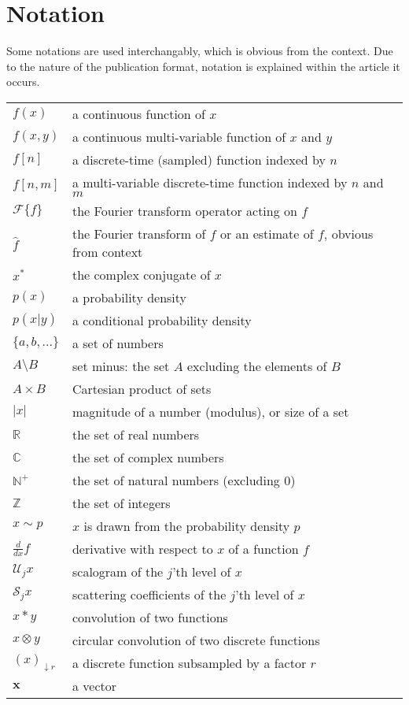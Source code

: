 \section*{Notation}
Some notations are used interchangably, which is obvious from the context. Due to the nature of the publication format, notation is explained within the article it occurs.

\begin{tabular}{p{} p{}}
    $f(x)$ & a continuous function of $x$ \\
    $f(x, y)$ & a continuous multi-variable function of $x$ and $y$ \\
    $f[n]$ & a discrete-time (sampled) function indexed by $n$ \\
    $f[n, m]$ & a multi-variable discrete-time function indexed by $n$ and $m$ \\
    $\mathcal{F} \{f\}$ & the Fourier transform operator acting on $f$\\
    $\hat{f}$ & the Fourier transform of $f$ or an estimate of $f$, obvious from context\\
    $x^*$ & the complex conjugate of $x$\\
    $p(x)$ & a probability density \\
    $p(x|y)$ & a conditional probability density \\
    $\{a, b, ...\}$ & a set of numbers\\
    $A \setminus B$ & set minus: the set $A$ excluding the elements of $B$\\
    $A \times B$ & Cartesian product of sets\\
    $| x |$ & magnitude of a number (modulus), or size of a set\\
    $\mathbb{R}$ & the set of real numbers\\
    $\mathbb{C}$ & the set of complex numbers\\
    $\mathbb{N^+}$ & the set of natural numbers (excluding 0)\\
    $\mathbb{Z}$ & the set of integers\\
    $x \sim p$ & $x$ is drawn from the probability density $p$\\
    $\frac{d}{dx} f$ & derivative with respect to $x$ of a function $f$\\
    $\mathcal{U}_j x$ & scalogram of the $j$'th level of $x$\\
    $\mathcal{S}_j x$ & scattering coefficients of the $j$'th level of $x$\\
    $x * y$ & convolution of two functions\\
    $x \otimes y$ & circular convolution of two discrete functions\\
    $(x)_{\downarrow r}$ & a discrete function subsampled by a factor $r$\\
    $\mathbf{x}$ & a vector\\
\end{tabular}

